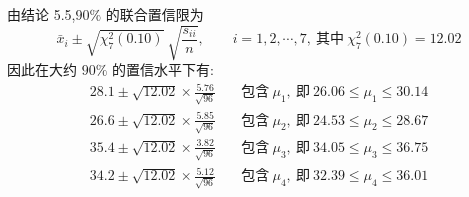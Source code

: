 由结论 5.5,$90\%$ 的联合置信限为
\[
\bar{x}_i\pm\sqrt{\chi_7^{2}(0.10)}\ \sqrt{\frac{s_{ii}}{n}},\qquad i=1,2,\cdots,7,\ \text{其中}\ \chi_7^{2}(0.10)=12.02
\]
因此在大约 $90\%$ 的置信水平下有:
\begin{align*}
28.1\pm\sqrt{12.02}\times\frac{5.76}{\sqrt{96}}&\quad\text{包含}\ \mu_1,\ \text{即}\ 26.06\leqslant\mu_1\leqslant30.14\\
26.6\pm\sqrt{12.02}\times\frac{5.85}{\sqrt{96}}&\quad\text{包含}\ \mu_2,\ \text{即}\ 24.53\leqslant\mu_2\leqslant28.67\\
35.4\pm\sqrt{12.02}\times\frac{3.82}{\sqrt{96}}&\quad\text{包含}\ \mu_3,\ \text{即}\ 34.05\leqslant\mu_3\leqslant36.75\\
34.2\pm\sqrt{12.02}\times\frac{5.12}{\sqrt{96}}&\quad\text{包含}\ \mu_4,\ \text{即}\ 32.39\leqslant\mu_4\leqslant36.01
\end{align*}
